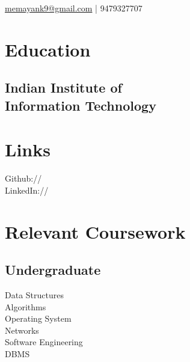 \documentclass[]{single-page-resume}
\begin{document}
%
%

%
%


{ 
\href{mailto:varagrawal@gmail.com}{memayank9@gmail.com} | 
9479327707
}

%
%

\begin{minipage}[t]{0.33\textwidth} 


\section{Education} 

\subsection{Indian Institute of \\
Information Technology}

\sectionsep


\section{Links} 
Github:// \href{https://github.com/saurabhMayank}{} \\
LinkedIn://  \href{https://www.linkedin.com/in/mayank95/}{} \\
\sectionsep


\section{Relevant Coursework}
\subsection{Undergraduate}
Data Structures \\
Algorithms \\
Operating System \\
Networks \\
Software Engineering \\
DBMS \\
\sectionsep


\end{minipage}
\end{document}
